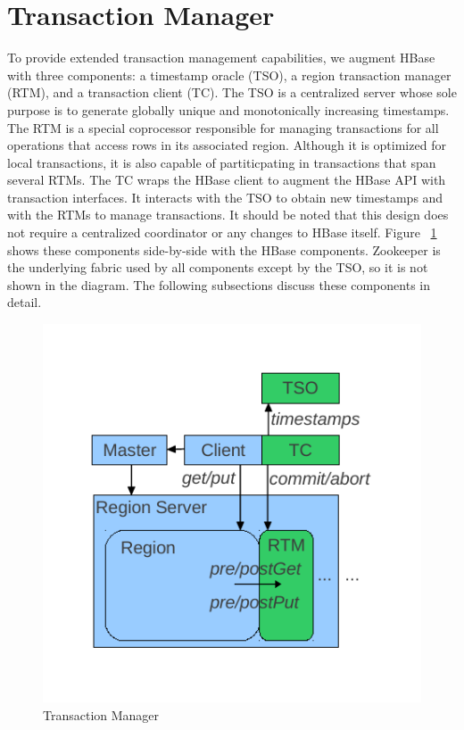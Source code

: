 \documentclass[10pt,final,journal]{IEEEtran}
\begin{document}
\section{Transaction Manager}
To provide extended transaction management capabilities, we augment HBase with three components: a timestamp oracle (TSO), a region transaction manager (RTM), and a transaction client (TC). The TSO is a centralized server whose sole purpose is to generate globally unique and monotonically increasing timestamps. The RTM is a special coprocessor responsible for managing transactions for all operations that access rows in its associated region. Although it is optimized for local transactions, it is also capable of partiticpating in transactions that span several RTMs. The TC wraps the HBase client to augment the HBase API with transaction interfaces. It interacts with the TSO to obtain new timestamps and with the RTMs to manage transactions. It should be noted that this design does not require a centralized coordinator or any changes to HBase itself. Figure ~\ref{tm} shows these components side-by-side with the HBase components. Zookeeper is the underlying fabric used by all components except by the TSO, so it is not shown in the diagram. The following subsections discuss these components in detail.

\begin{figure}[!t]
\centering
\hspace*{-.15in}
\includegraphics{images/tm.pdf}
\caption{Transaction Manager}
\label{tm}
\end{figure}
\end{document}
